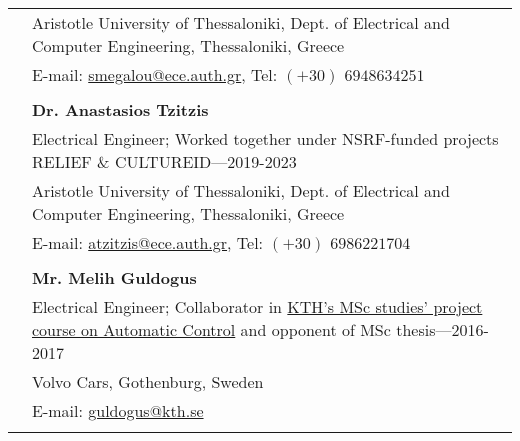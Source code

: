 \documentclass[a4paper,10pt,twoside]{article}
\begin{document}
\begin{tabular}{rp{14cm}}
&Aristotle University of Thessaloniki, Dept. of Electrical and Computer Engineering, Thessaloniki, Greece \\
& E-mail: \href{mailto: smegalou@ece.auth.gr}{smegalou@ece.auth.gr}, Tel: $(+30)$ $694 863 4251$ \\
&\\
& \textbf{Dr. Anastasios Tzitzis} \\
& {Electrical Engineer; Worked together under NSRF-funded projects RELIEF \& CULTUREID}---2019-2023\\
&Aristotle University of Thessaloniki, Dept. of Electrical and Computer Engineering, Thessaloniki, Greece \\
& E-mail: \href{mailto: atzitzis@ece.auth.gr}{atzitzis@ece.auth.gr}, Tel: $(+30)$ $698 622 1704$ \\
&\\
& \textbf{Mr. Melih Guldogus} \\
& {Electrical Engineer; Collaborator in \href{https://www.kth.se/student/kurser/kurs/EL2421?startterm=20162\&l=en}{KTH's MSc studies' project course on Automatic Control} and opponent of MSc thesis}---2016-2017\\
& Volvo Cars, Gothenburg, Sweden \\
& E-mail: \href{mailto: guldogus@kth.se}{guldogus@kth.se} \\
&\\
\end{tabular}
\end{document}
